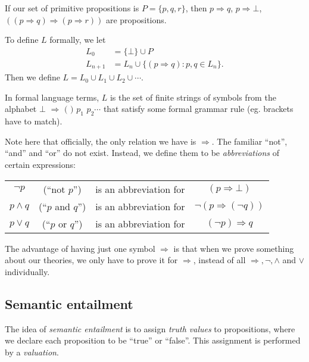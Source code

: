 \documentclass[a4paper]{article}
\begin{document}
\begin{eg}
  If our set of primitive propositions is $P = \{p, q, r\}$, then $p\Rightarrow q$, $p\Rightarrow \bot$, $((p\Rightarrow q)\Rightarrow (p\Rightarrow r))$ are propositions.
\end{eg}

To define $L$ formally, we let
\begin{align*}
  L_0 &= \{\bot\}\cup P\\
  L_{n + 1} &= L_n\cup \{(p\Rightarrow q): p, q\in L_n\}.
\end{align*}
Then we define  $L = L_0 \cup L_1\cup L_2\cup \cdots$.

In formal language terms, $L$ is the set of finite strings of symbols from the alphabet $\bot$ $\Rightarrow $ $($ $)$ $p_1$ $p_2 \cdots$ that satisfy some formal grammar rule (eg. brackets have to match).

Note here that officially, the only relation we have is $\Rightarrow$. The familiar ``not'', ``and'' and ``or'' do not exist. Instead, we define them to be \emph{abbreviations} of certain expressions:
\begin{defi}\leavevmode
  \begin{center}
    \begin{tabular}{cccc}
      $\neg p$ & (``not $p$'') & is an abbreviation for & $(p\Rightarrow \bot)$\\
      $p\wedge q$ & (``$p$ and $q$'') & is an abbreviation for & $\neg(p\Rightarrow (\neg q))$\\
      $p\vee q$ & (``$p$ or $q$'') & is an abbreviation for & $(\neg p)\Rightarrow q$
    \end{tabular}
  \end{center}
\end{defi}
The advantage of having just one symbol $\Rightarrow $ is that when we prove something about our theories, we only have to prove it for $\Rightarrow $, instead of all $\Rightarrow , \neg, \wedge$ and $\vee$ individually.
\subsection{Semantic entailment}
The idea of \emph{semantic entailment} is to assign \emph{truth values} to propositions, where we declare each proposition to be ``true'' or ``false''. This assignment is performed by a \emph{valuation}.
\end{document}
